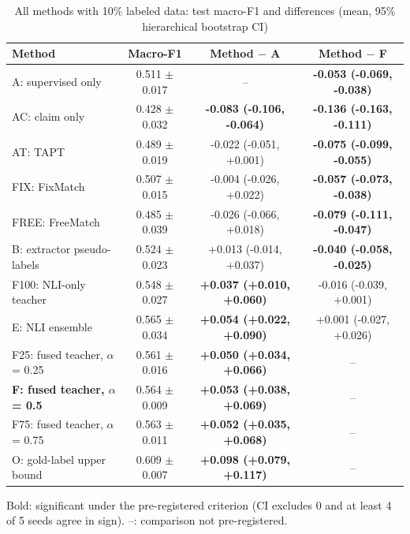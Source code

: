 \begin{table}[t]
\centering
\small
\caption{All methods with 10\% labeled data: test macro-F1 and differences (mean, 95\% hierarchical bootstrap CI)}
\begin{tabular}{lccc}
\toprule
Method & Macro-F1 & Method $-$ A & Method $-$ F \\
\midrule
A: supervised only & 0.511 $\pm$ 0.017 & -- & \textbf{-0.053 (-0.069, -0.038)} \\
AC: claim only & 0.428 $\pm$ 0.032 & \textbf{-0.083 (-0.106, -0.064)} & \textbf{-0.136 (-0.163, -0.111)} \\
AT: TAPT & 0.489 $\pm$ 0.019 & -0.022 (-0.051, +0.001) & \textbf{-0.075 (-0.099, -0.055)} \\
FIX: FixMatch & 0.507 $\pm$ 0.015 & -0.004 (-0.026, +0.022) & \textbf{-0.057 (-0.073, -0.038)} \\
FREE: FreeMatch & 0.485 $\pm$ 0.039 & -0.026 (-0.066, +0.018) & \textbf{-0.079 (-0.111, -0.047)} \\
B: extractor pseudo-labels & 0.524 $\pm$ 0.023 & +0.013 (-0.014, +0.037) & \textbf{-0.040 (-0.058, -0.025)} \\
F100: NLI-only teacher & 0.548 $\pm$ 0.027 & \textbf{+0.037 (+0.010, +0.060)} & -0.016 (-0.039, +0.001) \\
E: NLI ensemble & 0.565 $\pm$ 0.034 & \textbf{+0.054 (+0.022, +0.090)} & +0.001 (-0.027, +0.026) \\
F25: fused teacher, $\alpha$ = 0.25 & 0.561 $\pm$ 0.016 & \textbf{+0.050 (+0.034, +0.066)} & -- \\
\textbf{F: fused teacher, $\alpha$ = 0.5} & 0.564 $\pm$ 0.009 & \textbf{+0.053 (+0.038, +0.069)} & -- \\
F75: fused teacher, $\alpha$ = 0.75 & 0.563 $\pm$ 0.011 & \textbf{+0.052 (+0.035, +0.068)} & -- \\
O: gold-label upper bound & 0.609 $\pm$ 0.007 & \textbf{+0.098 (+0.079, +0.117)} & -- \\
\bottomrule
\end{tabular}
\par\smallskip\footnotesize Bold: significant under the pre-registered criterion (CI excludes 0 and at least 4 of 5 seeds agree in sign). --: comparison not pre-registered.
\end{table}

